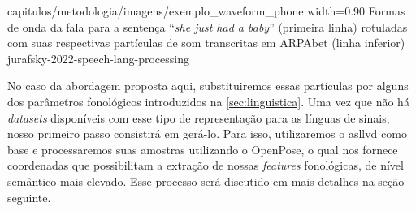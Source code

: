 {capitulos/metodologia/imagens/exemplo_waveform_phone}
{width=0.90\textwidth}
{Formas de onda da fala para a sentença ``\textit{she just had a baby}'' (primeira linha) rotuladas com suas respectivas partículas de som transcritas em ARPAbet (linha inferior)}
{jurafsky-2022-speech-lang-processing}






No caso da abordagem proposta aqui, substituiremos essas partículas por alguns dos parâmetros fonológicos introduzidos na \autoref{sec:linguistica}. Uma vez que não há \textit{datasets} disponíveis com esse tipo de representação para as línguas de sinais, nosso primeiro passo consistirá em gerá-lo. Para isso, utilizaremos o \acrshort{asllvd} como base e processaremos suas amostras utilizando o OpenPose, o qual nos fornece coordenadas que possibilitam a extração de nossas \textit{features} fonológicas, de nível semântico mais elevado.
Esse processo será discutido em mais detalhes na seção seguinte.





